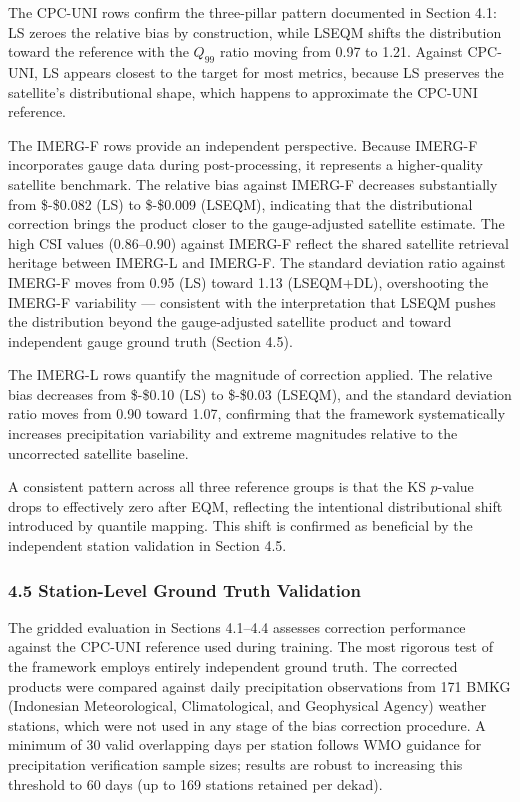 \documentclass[
]{article}
\begin{document}
The CPC-UNI rows confirm the three-pillar pattern documented in Section
4.1: LS zeroes the relative bias by construction, while LSEQM shifts the
distribution toward the reference with the \(Q_{99}\) ratio moving from
0.97 to 1.21. Against CPC-UNI, LS appears closest to the target for most
metrics, because LS preserves the satellite's distributional shape,
which happens to approximate the CPC-UNI reference.

The IMERG-F rows provide an independent perspective. Because IMERG-F
incorporates gauge data during post-processing, it represents a
higher-quality satellite benchmark. The relative bias against IMERG-F
decreases substantially from \$-\$0.082 (LS) to \$-\$0.009 (LSEQM),
indicating that the distributional correction brings the product closer
to the gauge-adjusted satellite estimate. The high CSI values
(0.86--0.90) against IMERG-F reflect the shared satellite retrieval
heritage between IMERG-L and IMERG-F. The standard deviation ratio
against IMERG-F moves from 0.95 (LS) toward 1.13 (LSEQM+DL),
overshooting the IMERG-F variability --- consistent with the
interpretation that LSEQM pushes the distribution beyond the
gauge-adjusted satellite product and toward independent gauge ground
truth (Section 4.5).

The IMERG-L rows quantify the magnitude of correction applied. The
relative bias decreases from \$-\$0.10 (LS) to \$-\$0.03 (LSEQM), and
the standard deviation ratio moves from 0.90 toward 1.07, confirming
that the framework systematically increases precipitation variability
and extreme magnitudes relative to the uncorrected satellite baseline.

A consistent pattern across all three reference groups is that the KS
\(p\)-value drops to effectively zero after EQM, reflecting the
intentional distributional shift introduced by quantile mapping. This
shift is confirmed as beneficial by the independent station validation
in Section 4.5.

\subsubsection{4.5 Station-Level Ground Truth
Validation}\label{station-level-ground-truth-validation}

The gridded evaluation in Sections 4.1--4.4 assesses correction
performance against the CPC-UNI reference used during training. The most
rigorous test of the framework employs entirely independent ground
truth. The corrected products were compared against daily precipitation
observations from 171 BMKG (Indonesian Meteorological, Climatological,
and Geophysical Agency) weather stations, which were not used in any
stage of the bias correction procedure. A minimum of 30 valid
overlapping days per station follows WMO guidance for precipitation
verification sample sizes; results are robust to increasing this
threshold to 60 days (up to 169 stations retained per dekad).
\end{document}
